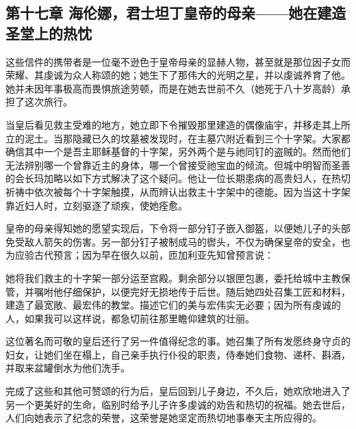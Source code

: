 
\subsection{第十七章 海伦娜，君士坦丁皇帝的母亲——她在建造圣堂上的热忱}

这些信件的携带者是一位毫不逊色于皇帝母亲的显赫人物，甚至就是那位因子女而荣耀、其虔诚为众人称颂的她；她生下了那伟大的光明之星，并以虔诚养育了他。她并未因年事极高而畏惧旅途劳顿，而是在她去世前不久（她死于八十岁高龄）承担了这次旅行。\par

当皇后看见救主受难的地方，她立即下令摧毁那里建造的偶像庙宇，并移走其上所立的泥土。当那隐藏已久的坟墓被发现时，在主墓穴附近看到三个十字架。大家都确信其中一个是吾主耶稣基督的十字架，另外两个是与祂同钉的盗贼的。然而他们无法辨别哪一个曾靠近主的身体，哪一个曾接受祂宝血的倾流。但城中明智而圣善的会长玛加略以如下方式解决了这个疑问。他让一位长期患病的高贵妇人，在热切祈祷中依次被每个十字架触摸，从而辨认出救主十字架中的德能。因为当这十字架靠近妇人时，立刻驱逐了顽疾，使她痊愈。\par

皇帝的母亲得知她的愿望实现后，下令将一部分钉子嵌入御盔，以便她儿子的头部免受敌人箭矢的伤害。另一部分钉子被制成马的辔头，不仅为确保皇帝的安全，也为应验古代预言；因为早在很久以前，匝加利亚先知曾预言说：\par

她将我们救主的十字架一部分运至宫殿。剩余部分以银匣包裹，委托给城中主教保管，并嘱咐他仔细保护，以便完好无损地传于后世。随后她四处召集工匠和材料，建造了最宽敞、最宏伟的教堂。描述它们的美与宏伟实无必要；因为所有虔诚的人，如果我可以这样说，都急切前往那里瞻仰建筑的壮丽。\par

这位著名而可敬的皇后还行了另一件值得纪念的事。她召集了所有发愿终身守贞的妇女，让她们坐在榻上，自己亲手执行仆役的职责，侍奉她们食物、递杯、斟酒，并取来盆罐倒水为他们洗手。\par

完成了这些和其他可赞颂的行为后，皇后回到儿子身边，不久后，她欢欣地进入了另一个更美好的生命，临别时给予儿子许多虔诚的劝告和热切的祝福。她去世后，人们向她表示了纪念的荣誉，这荣誉是她坚定而热切地事奉天主所应得的。\par


